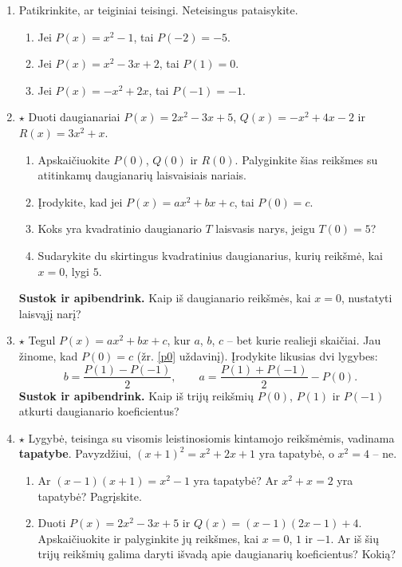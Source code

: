 \documentclass[12pt,a4paper]{exam}
\begin{document}
\begin{enumerate}
\begin{enumerate}
\item Apskaičiuokite $P(-1)$, $Q(-1)$, $P(0)+Q(0)$ ir $P(1)-Q(1)$.
\item Ką reiškia lygybė $P(3)=Q(2)$? Patikrinkite, ar ji teisinga.
\end{enumerate}
\item Patikrinkite, ar teiginiai teisingi. Neteisingus pataisykite.
\begin{enumerate}
\item Jei $P(x)=x^2-1$, tai $P(-2)=-5$.
\item Jei $P(x)=x^2-3x+2$, tai $P(1)=0$.
\item Jei $P(x)=-x^2+2x$, tai $P(-1)=-1$.
\end{enumerate}
\item\label{p0} $\star$ Duoti daugianariai $P(x)=2x^2-3x+5$, $Q(x)=-x^2+4x-2$ ir $R(x)=3x^2+x$.
\begin{enumerate}
\item Apskaičiuokite $P(0)$, $Q(0)$ ir $R(0)$. Palyginkite šias reikšmes su atitinkamų daugianarių laisvaisiais nariais.
\item Įrodykite, kad jei $P(x)=ax^2+bx+c$, tai $P(0)=c$.
\item Koks yra kvadratinio daugianario $T$ laisvasis narys, jeigu $T(0)=5$?
\item Sudarykite du skirtingus kvadratinius daugianarius, kurių reikšmė, kai $x=0$, lygi $5$.
\end{enumerate}
\textbf{Sustok ir apibendrink.} Kaip iš daugianario reikšmės, kai $x=0$, nustatyti laisvąjį narį?
\item\label{koef-formules} $\star$ Tegul $P(x)=ax^2+bx+c$, kur $a$, $b$, $c$ – bet kurie realieji skaičiai. Jau žinome, kad $P(0)=c$ (žr. \ref{p0} uždavinį). Įrodykite likusias dvi lygybes:
\[
b=\frac{P(1)-P(-1)}{2},\qquad
 a=\frac{P(1)+P(-1)}{2}-P(0).
\]
\textbf{Sustok ir apibendrink.} Kaip iš trijų reikšmių $P(0)$, $P(1)$ ir $P(-1)$ atkurti daugianario koeficientus?
\needspace{6cm}
\item $\star$ Lygybė, teisinga su visomis leistinosiomis kintamojo reikšmėmis, vadinama \textbf{tapatybe}. Pavyzdžiui, $(x+1)^2=x^2+2x+1$ yra tapatybė, o $x^2=4$ – ne.
\begin{enumerate}
\item Ar $(x-1)(x+1)=x^2-1$ yra tapatybė? Ar $x^2+x=2$ yra tapatybė? Pagrįskite.
\item Duoti $P(x)=2x^2-3x+5$ ir $Q(x)=(x-1)(2x-1)+4$. Apskaičiuokite ir palyginkite jų reikšmes, kai $x=0$, $1$ ir $-1$. Ar iš šių trijų reikšmių galima daryti išvadą apie daugianarių koeficientus? Kokią?

\end{enumerate}
\end{enumerate}
\end{document}
